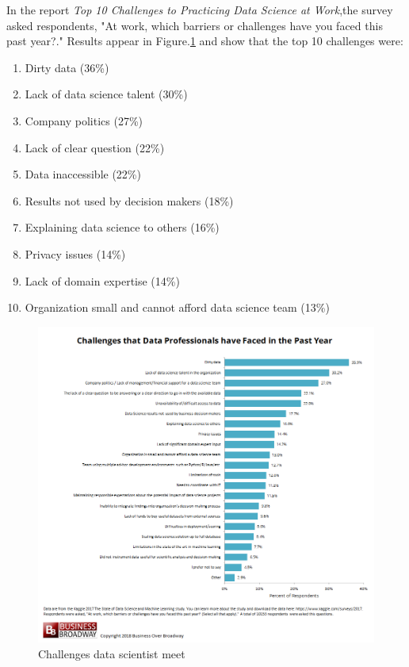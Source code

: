 \documentclass[a4paper, 11pt,twoside=true]{scrartcl}
\begin{document}
\quad In the report \textit{Top 10 Challenges to Practicing Data Science at Work},the survey asked respondents, "At work, which barriers or challenges have you faced this past year?." Results appear in Figure.\ref{P1F2} and show that the top 10 challenges were:\\
\begin{enumerate}
\item Dirty data (36\%) \\
\item Lack of data science talent (30\%) \\
\item Company politics (27\%) \\
\item Lack of clear question (22\%) \\
\item Data inaccessible (22\%) \\
\item Results not used by decision makers (18\%) \\
\item Explaining data science to others (16\%) \\
\item Privacy issues (14\%) \\
\item Lack of domain expertise (14\%) \\
\item Organization small and cannot afford data science team (13\%)\\
\end{enumerate}

\begin{figure}[h]
	\small
	\centering
	\includegraphics[width=13cm]{P1F2}
	\caption{Challenges data scientist meet} \label{P1F2}
\end{figure}
\end{document}
